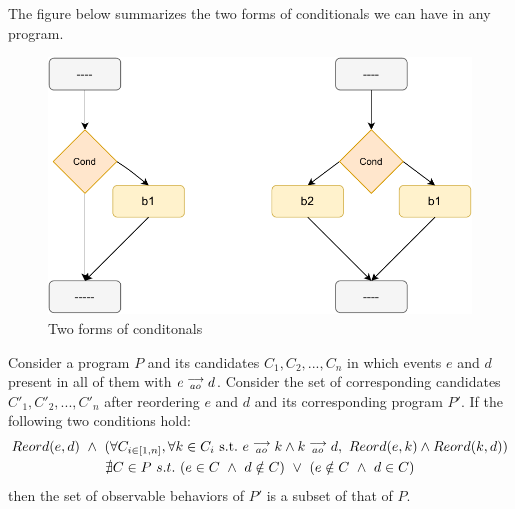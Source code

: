         The figure below summarizes the two forms of conditionals we can have in any program. 
        \begin{figure}[H]
            \centering 
            \includegraphics[scale=0.7]{5.InstructionReordering/5.ValidReorderingProgram/Conditionals2Form.pdf}
            \caption{Two forms of conditonals}
        \end{figure}


        \begin{corollary}
            \label{ReordCond}
            Consider a program $P$ and its candidates $C_1, C_2, ... , C_n$ in which events $e$ and $d$ present in all of them with $e\stackrel{\longrightarrow}{_{ao}}d$. Consider the set of corresponding candidates $C'_1, C'_2, ... , C'_n$ after reordering $e$ and $d$ and its corresponding program $P'$. If the following two conditions hold:
            \begin{gather*}
                Reord(e,d) \ \wedge \ 
                ( \forall C_{i \in [1,n]}, \forall k \in C_i \ \text{s.t.} \ \reln{e}{ao}{k} \wedge \reln{k}{ao}{d}, \    
                Reord(e,k) \wedge Reord(k,d) ) \\
                \nexists C \in P \ s.t. \ 
                    (e \in C \ \wedge \ d \notin C) \ \vee \ 
                    (e \notin C \ \wedge \ d \in C) 
            \end{gather*}
            then the set of observable behaviors of $P'$ is a subset of that of $P$. 
        \end{corollary}

